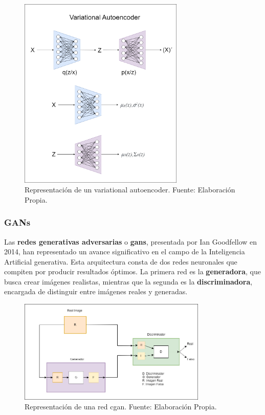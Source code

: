 \begin{figure}[H]
	\centering
	\includegraphics[width=0.7\textwidth]{figures/variational_autoencoder_model.png}
	\caption{\label{fig:vaerepresentation} Representación de un variational autoencoder. Fuente: Elaboración Propia.}
\end{figure}

\subsubsection{GANs}
\quad Las \textbf{redes generativas adversarias} o \textbf{\glspl{gan}}, presentada por Ian Goodfellow en 2014\cite{gan}, han representado un avance significativo en el campo de la Inteligencia Artificial generativa. Esta arquitectura consta de dos redes neuronales que compiten por producir resultados óptimos. La primera red es la \textbf{generadora}, que busca crear imágenes realistas, mientras que la segunda es la \textbf{discriminadora}, encargada de distinguir entre imágenes reales y generadas.

\begin{figure}[H]
	\centering
	\includegraphics[width=0.8\textwidth]{figures/Basic_GAN.png}
	\caption{\label{fig:basicgan} Representación de una red \gls{cgan}. Fuente: Elaboración Propia.}
\end{figure}

